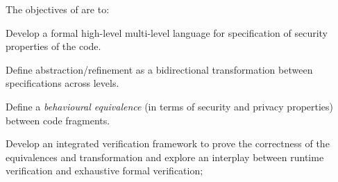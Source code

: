 \addtocounter{wpno}{1}
\begin{Workpackage}{\thewpno}
\WPTitle{\wpname{\thewpno}}


\begin{WPObjectives}
The objectives of \theWP{} are to:
\begin{compactitem}
\item Develop a formal high-level multi-level language for specification of security properties of the code. 

\item Define abstraction/refinement as a bidirectional transformation between specifications across levels.


\item Define a \emph{behavioural equivalence} (in terms of security and privacy properties) between code fragments.


\item Develop an integrated verification framework to prove the correctness of the equivalences and transformation and 
explore an interplay between runtime verification and exhaustive formal verification;


\end{compactitem}
\end{WPObjectives}
\end{Workpackage}
